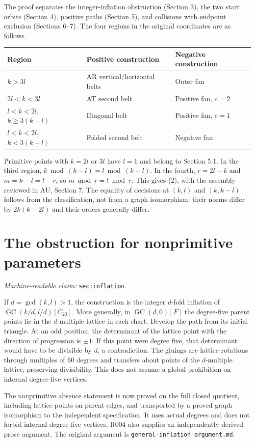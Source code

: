 \documentclass[11pt]{amsart}
\newcommand{\GC}{\operatorname{GC}}
\newcommand{\record}[1]{\nolinkurl{#1}}
\newcommand{\claimid}[1]{\par\nopagebreak\noindent\textit{Machine-readable claim:} \record{#1}.\par}
\begin{document}
The proof separates the integer-inflation obstruction (Section 3),
the two start orbits (Section 4), positive paths (Section 5), and
collisions with endpoint exclusion (Sections 6--7). The four regions
in the original coordinates are as follows.
\begin{center}\small
\begin{tabular}{lll}\toprule
Region & Positive construction & Negative construction\\\midrule
$k>3l$ & AR vertical/horizontal belts & Outer fan\\
$2l<k<3l$ & AT second belt & Positive fan, $c=2$\\
$l<k<2l$, $k\ge3(k-l)$ & Diagonal belt & Positive fan, $c=1$\\
$l<k<2l$, $k<3(k-l)$ & Folded second belt & Negative fan\\\bottomrule
\end{tabular}\end{center}
Primitive points with $k=2l$ or $3l$ have $l=1$ and belong to
Section 5.1. In the third region, $k\bmod(k-l)=l\bmod(k-l)$.
In the fourth, $r=2l-k$ and $m=k-l=l-r$, so $m\bmod r=l\bmod r$.
This gives (2), with the assembly reviewed in AU, Section 7.
The equality of decisions at $(k,l)$ and $(k,k-l)$ follows from the
classification, not from a graph isomorphism: their norms differ by
$2k(k-2l)$ and their orders generally differ.

\section{The obstruction for nonprimitive parameters}\label{sec:inflation}
\claimid{sec:inflation}
If $d=\gcd(k,l)>1$, the construction is the integer $d$-fold inflation
of $\GC(k/d,l/d)[C_{20}]$. More generally, in $\GC(d,0)[F]$ the
degree-five parent points lie in the $d$-multiple lattice in each chart.
Develop the path from its initial triangle. At an odd position, the
determinant of the lattice point with the direction of progression is
$\pm1$. If this point were degree five, that determinant would have to
be divisible by $d$, a contradiction. The gluings are lattice rotations
through multiples of $60$ degrees and transfers about points of the
$d$-multiple lattice, preserving divisibility. This does not assume a
global prohibition on internal degree-five vertices.

The nonprimitive absence statement is now proved on the full closed
quotient, including lattice points on parent edges, and transported by
a proved graph isomorphism to the independent specification. It uses
actual degrees and does not forbid internal degree-five vertices.
R004 also supplies an independently derived prose argument. The original argument is
\record{general-inflation-argument.md}.
\end{document}
